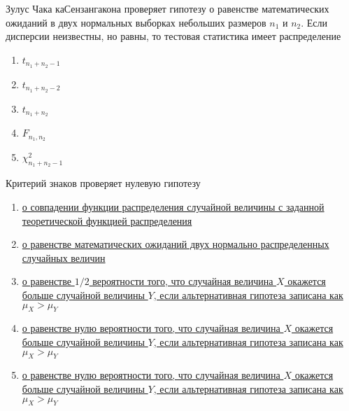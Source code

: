\documentclass[t]{beamer}
\begin{document}
 \begin{frame} \label{25} 
\begin{block}{25} 

Зулус Чака каСензангакона проверяет гипотезу  о равенстве математических ожиданий в двух нормальных выборках небольших размеров $n_1$   и  $n_2$. Если дисперсии неизвестны, но равны, то тестовая статистика имеет распределение
 


 \end{block} 
\begin{enumerate} 
\item[] \hyperlink{25-No}{\beamergotobutton{} $t_{n_1+n_2-1}$}
\item[] \hyperlink{25-Yes}{\beamergotobutton{} $t_{n_1+n_2-2}$}
\item[] \hyperlink{25-No}{\beamergotobutton{} $t_{n_1+n_2}$}
\item[] \hyperlink{25-No}{\beamergotobutton{} $F_{n_1,n_2}$}
\item[] \hyperlink{25-No}{\beamergotobutton{} $\chi^2_{n_1+n_2-1}$}
\end{enumerate} 
\end{frame} 


 \begin{frame} \label{26} 
\begin{block}{26} 

Критерий знаков проверяет нулевую гипотезу
 


 \end{block} 
\begin{enumerate} 
\item[] \hyperlink{26-No}{\beamergotobutton{} о совпадении функции распределения случайной величины с заданной теоретической функцией распределения}
\item[] \hyperlink{26-No}{\beamergotobutton{} о равенстве математических ожиданий двух нормально распределенных случайных величин}
\item[] \hyperlink{26-No}{\beamergotobutton{} о равенстве $1/2$ вероятности того, что случайная величина $X$ окажется больше случайной величины $Y$, если альтернативная гипотеза записана как $\mu_X>\mu_Y$}
\item[] \hyperlink{26-No}{\beamergotobutton{} о равенстве нулю вероятности того, что случайная величина $X$ окажется больше случайной величины $Y$, если альтернативная гипотеза записана как $\mu_X>\mu_Y$ }
\item[] \hyperlink{26-Yes}{\beamergotobutton{} о равенстве нулю вероятности того, что случайная величина $X$ окажется больше случайной величины $Y$, если альтернативная гипотеза записана как $\mu_X>\mu_Y$}
\end{enumerate} 
\end{frame} 
\end{document}
